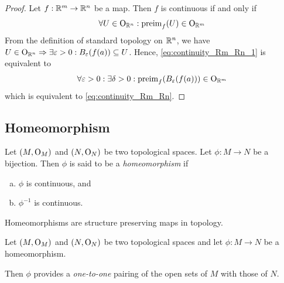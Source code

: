 \begin{proof}
	Let \(f: \mathbb R^m \to \mathbb R^n\) be a map. Then \(f\) is continuous if and only if
	\begin{equation}
		\forall U \in \mathrm{O}_{\mathbb R^n}: \operatorname{preim}_{f}(U) \in \mathrm{O}_{\mathbb R^m} \label{eq:continuity_Rm_Rn_1}
	\end{equation}
	From the definition of standard topology on \(\mathbb R^n\), we have \(U \in \mathrm{O}_{\mathbb R^n} \Rightarrow \exists \varepsilon > 0: B_{\varepsilon}(f(a)) \subseteq U\). Hence, \eqref{eq:continuity_Rm_Rn_1} is equivalent to
	\begin{equation}
		\forall \varepsilon > 0: \exists \delta > 0: \operatorname{preim}_{f}(B_{\varepsilon}(f(a))) \in \mathrm{O}_{\mathbb R^m} \label{eq:continuity_Rm_Rn_2}
	\end{equation}
	which is equivalent to \eqref{eq:continuity_Rm_Rn}.
\end{proof}

\subsection{Homeomorphism}

\begin{definition}[Homeomorphism]
	Let \((M, \mathrm{O}_M)\) and \((N, \mathrm{O}_N)\) be two topological spaces. Let \(\phi: M \to N\) be a bijection. Then \(\phi\) is said to be a \emph{homeomorphism} if
	\begin{enumerate}[(a)]
		\item \(\phi\) is continuous, and
		\item \(\phi^{-1}\) is continuous.
	\end{enumerate}
\end{definition}

\begin{remark}
	Homeomorphisms are structure preserving maps in topology.
\end{remark}

\begin{remark}
	Let \((M, \mathrm{O}_M)\) and \((N, \mathrm{O}_N)\) be two topological spaces and let \(\phi: M \to N\) be a homeomorphism.
	\begin{figure}[H]
		\centering
	\end{figure}
	Then \(\phi\) provides a \emph{one-to-one} pairing of the open sets of \(M\) with those of \(N\).
\end{remark}

